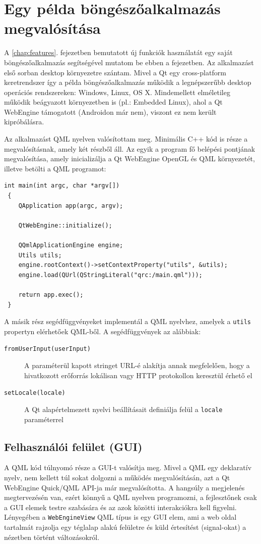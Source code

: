 \documentclass[12pt]{report}
\begin{document}
\chapter{Egy példa böngészőalkalmazás megvalósítása}

A \ref{chap:features}. fejezetben bemutatott új funkciók használatát egy saját
böngészőalkalmazás segítségével mutatom be ebben a fejezetben. Az alkalmazást első sorban
desktop környezetre szántam. Mivel a Qt egy cross-platform keretrendszer így a példa
böngészőalkalmazás működik a legnépszerűbb desktop operációs rendszereken: Windows, Linux,
OS X. Mindemellett elméletileg működik beágyazott környezetben is (pl.: Embedded Linux),
ahol a Qt WebEngine támogatott (Androidon már nem), viszont ez nem került kipróbálásra.

Az alkalmazást QML nyelven valósítottam meg. Minimális C++ kód is része a megvalósításnak,
amely két részből áll. Az egyik a program fő belépési pontjának megvalósítása, amely
inicializálja a Qt WebEngine OpenGL és QML környezetét, illetve betölti a QML programot:
\begin{lstlisting}[title=main.cpp]
 int main(int argc, char *argv[])
 {
    QApplication app(argc, argv);

    QtWebEngine::initialize();

    QQmlApplicationEngine engine;
    Utils utils;
    engine.rootContext()->setContextProperty("utils", &utils);
    engine.load(QUrl(QStringLiteral("qrc:/main.qml")));

    return app.exec();
 }
\end{lstlisting}
A másik rész segédfüggvényeket implementál a QML nyelvhez, amelyek a \texttt{utils} propertyn
elérhetőek QML-ből. A segédfüggvények az alábbiak:
\begin{description}
    \item[\texttt{fromUserInput(userInput)}] A paraméterül kapott stringet URL-é alakítja
        annak megfelelően, hogy a hivatkozott erőforrás lokálisan vagy HTTP protokollon
        keresztül érhető el
    \item[\texttt{setLocale(locale)}] A Qt alapértelmezett nyelvi beállításait definiálja
        felül a \texttt{locale} paraméterrel
\end{description}

\section{Felhasználói felület (GUI)}

A QML kód túlnyomó része a GUI-t valósítja meg. Mivel a QML egy deklaratív nyelv, nem kellett
túl sokat dolgozni a működés megvalósításán, azt a Qt WebEngine Quick/QML API-ja már
megvalósította. A hangsúly a megjelenés megtervezésén van, ezért könnyű a QML nyelven
programozni, a fejlesztőnek csak a GUI elemek testre szabására és az azok közötti
interakciókra kell figyelni. Lényegében a \texttt{WebEngineView} QML típus is egy GUI elem,
ami a web oldal tartalmát rajzolja egy téglalap alakú felületre és küld értesítést
(signal-okat) a nézetben történt változásokról.
\end{document}
